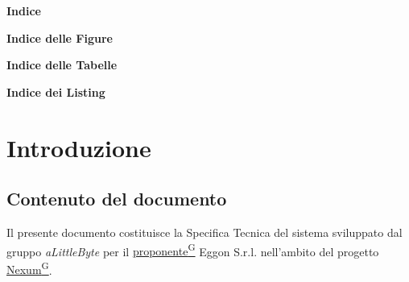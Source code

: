 \documentclass[a4paper,12pt]{article}
\providecommand{\glslink}[2]{\href{https://alittlebyte-19.github.io/Documentazione/glossario.html\#gls-#1}{\underline{#2}\textsuperscript{\scriptsize G}}}
\begin{document}
\begin{center}
    {\Large \textbf{Indice}}
\end{center}

\vspace{0.6cm}

\makeatletter
{}
\makeatother

\newpage

\begin{center}
    {\Large \textbf{Indice delle Figure}}
\end{center}

\vspace{0.6cm}

\makeatletter
{}
\makeatother

\newpage

\begin{center}
    {\Large \textbf{Indice delle Tabelle}}
\end{center}

\vspace{0.6cm}

\makeatletter
{}
\makeatother

\newpage

\begin{center}
    {\Large \textbf{Indice dei Listing}}
\end{center}

\vspace{0.6cm}

\makeatletter
{}
\makeatother

\newpage
{}
\hypersetup{pageanchor=true}
\setcounter{page}{7}

\section{Introduzione}

\subsection{Contenuto del documento}

Il presente documento costituisce la Specifica Tecnica del sistema sviluppato dal gruppo \textit{aLittleByte} per il \glslink{committente-proponente}{proponente} Eggon S.r.l. nell'ambito del progetto \glslink{nexum}{Nexum}.
\end{document}
